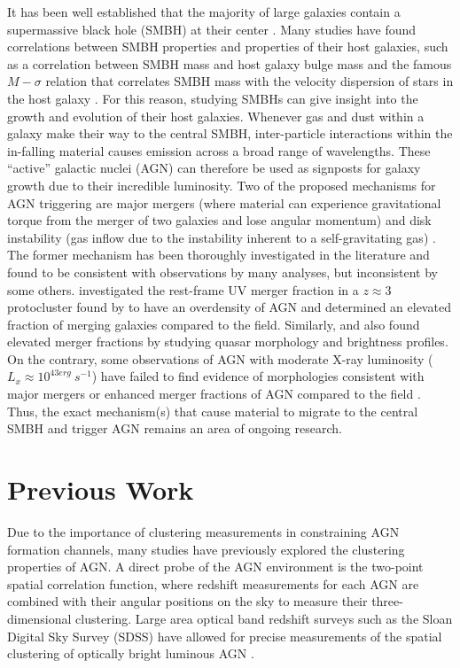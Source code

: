\documentclass[preprint]{aastex63}
\begin{document}
It has been well established that the majority of large galaxies contain a supermassive black hole (SMBH)
at their center \citep{magorrian}. Many studies have found correlations between SMBH properties and properties of their 
host galaxies, such as a correlation between SMBH mass and host galaxy bulge mass \citep{mcconnel} and the famous $M-\sigma$ relation that correlates SMBH mass with 
the velocity dispersion of stars in the host galaxy \citep{gebhardt}. For this reason, studying SMBHs can give insight into the growth 
and evolution of their host galaxies.  Whenever gas and dust within a galaxy make their way to the central SMBH, inter-particle interactions within the 
in-falling material causes emission across a broad range of wavelengths. These ``active'' galactic nuclei (AGN) can 
therefore be used as signposts for galaxy growth due to their incredible luminosity. 
 Two of the proposed mechanisms for AGN triggering are major mergers (where material can experience gravitational torque from the merger of two galaxies and lose angular momentum) and disk instability (gas inflow due to the instability 
inherent to a self-gravitating gas) \citep{oogi}. The former mechanism  has been thoroughly investigated in the literature and found to be consistent with observations by many analyses, but inconsistent by some others. 
\citet{hine} investigated the rest-frame UV merger fraction in a $z\approx 3$ protocluster found by \citet{lehmer} to have an overdensity of AGN and determined an elevated fraction of merging galaxies compared to the field. Similarly, \citet{fan} and \citet{glikman} 
also found elevated merger fractions by studying quasar morphology and brightness profiles. On the contrary,  some observations of AGN with moderate X-ray luminosity ($L_x \approx 10^{43 erg} \ s^{-1}$) have failed to find evidence of morphologies consistent with major mergers \citep{kocevski,cisternas:2011} 
or enhanced merger fractions of AGN compared to the field \citep{marian:2019}. Thus, the exact mechanism(s) that cause material to migrate to the central SMBH and trigger AGN remains an area of ongoing research. 


\section{Previous Work} 
Due to the importance of clustering measurements in constraining AGN formation channels, many studies have previously explored the clustering properties of AGN. 
A direct probe of the AGN environment is the two-point spatial correlation function, where redshift measurements for each AGN are
combined with their angular positions on the sky to measure their three-dimensional clustering. Large area optical band redshift surveys such as the Sloan Digital Sky Survey (SDSS) 
have allowed for precise measurements of the spatial clustering of optically bright luminous AGN  \citep{ross:2009}. 
\end{document}
